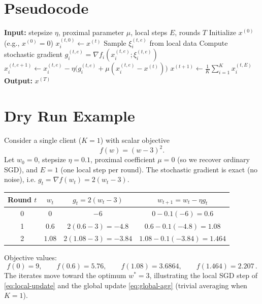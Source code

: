 \documentclass{article}
\begin{document}
\vspace{0.2cm}
\section*{Pseudocode}
\begin{algorithm}[H]
\caption{FedProx‑SGD}
\begin{algorithmic}[1]
\State \textbf{Input:} stepsize $\eta$, proximal parameter $\mu$, local steps $E$, rounds $T$
\State Initialize $x^{(0)}$ (e.g., $x^{(0)}=0$)
        \State $x_{i}^{(t,0)}\gets x^{(t)}$
            \State Sample $\xi_{i}^{(t,e)}$ from local data
            \State Compute stochastic gradient $g_{i}^{(t,e)}=\nabla f_i(x_{i}^{(t,e)};\xi_{i}^{(t,e)})$
            \State $x_{i}^{(t,e+1)}\gets x_{i}^{(t,e)}-\eta\bigl(g_{i}^{(t,e)}+\mu(x_{i}^{(t,e)}-x^{(t)})\bigr)$
        \EndFor
    \EndFor
    \State $x^{(t+1)}\gets \frac{1}{K}\sum_{i=1}^{K}x_{i}^{(t,E)}$   
\EndFor
\State \textbf{Output:} $x^{(T)}$
\end{algorithmic}
\end{algorithm}

\vspace{0.2cm}
\section*{Dry Run Example}
Consider a single client ($K=1$) with scalar objective
\[
f(w)=(w-3)^{2}.
\]
Let $w_{0}=0$, stepsize $\eta=0.1$, proximal coefficient $\mu=0$ (so we recover ordinary SGD), and $E=1$ (one local step per round). The stochastic gradient is exact (no noise), i.e. $g_{t}= \nabla f(w_{t})=2(w_{t}-3)$.

\begin{center}
\begin{tabular}{c|c|c|c}
\textbf{Round $t$} & $w_{t}$ & $g_{t}=2(w_{t}-3)$ & $w_{t+1}=w_{t}-\eta g_{t}$ \\ \hline
0 & $0$ & $-6$ & $0-0.1(-6)=0.6$ \\ 
1 & $0.6$ & $2(0.6-3)=-4.8$ & $0.6-0.1(-4.8)=1.08$ \\ 
2 & $1.08$ & $2(1.08-3)=-3.84$ & $1.08-0.1(-3.84)=1.464$ 
\end{tabular}
\end{center}
Objective values:
\[
f(0)=9,\qquad f(0.6)=5.76,\qquad f(1.08)=3.6864,\qquad f(1.464)=2.207\,.
\]
The iterates move toward the optimum $w^{*}=3$, illustrating the local SGD step of \eqref{eq:local-update} and the global update \eqref{eq:global-agg} (trivial averaging when $K=1$).
\end{document}
